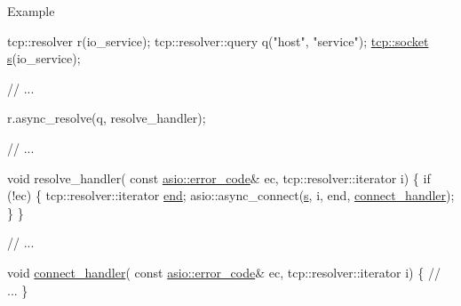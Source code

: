 \begin{DoxyParagraph}{Example}

\begin{DoxyCode}
 tcp::resolver r(io\_service);
tcp::resolver::query q(\textcolor{stringliteral}{"host"}, \textcolor{stringliteral}{"service"});
\hyperlink{namespacewebsocketpp_1_1transport_1_1asio_1_1socket_1_1error_a828ddaa5ed63a761e1b557465a35f05aa0c31b356014843e1d09514e794a539a7}{tcp::socket} \hyperlink{group__async__connect_ga31ab74b9ea6c77932dddd016cfc7920a}{s}(io\_service);

\textcolor{comment}{// ...}

r.async\_resolve(q, resolve\_handler);

\textcolor{comment}{// ...}

\textcolor{keywordtype}{void} resolve\_handler(
    \textcolor{keyword}{const} \hyperlink{classasio_1_1error__code}{asio::error\_code}& ec,
    tcp::resolver::iterator i)
\{
  \textcolor{keywordflow}{if} (!ec)
  \{
    tcp::resolver::iterator \hyperlink{group__async__connect_gadb6ad0193229ae84828688e812cd325c}{end};
    asio::async\_connect(\hyperlink{group__async__connect_ga31ab74b9ea6c77932dddd016cfc7920a}{s}, i, end, \hyperlink{namespacewebsocketpp_1_1transport_ac392fca34e946b48414278c0c3addfa5}{connect\_handler});
  \}
\}

\textcolor{comment}{// ...}

\textcolor{keywordtype}{void} \hyperlink{namespacewebsocketpp_1_1transport_ac392fca34e946b48414278c0c3addfa5}{connect\_handler}(
    \textcolor{keyword}{const} \hyperlink{classasio_1_1error__code}{asio::error\_code}& ec,
    tcp::resolver::iterator i)
\{
  \textcolor{comment}{// ...}
\} 
\end{DoxyCode}
 
\end{DoxyParagraph}
\hypertarget{group__async__connect_ga97861978f077050db440c518ba215350}{}
